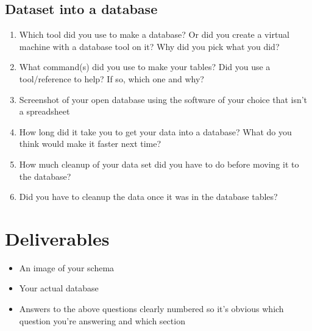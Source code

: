 \documentclass[12pt]{article}
\begin{document}
\subsection*{Dataset into a database}
    \begin{enumerate}
        \item Which tool did you use to make a database? Or did you create a virtual machine with a database tool on it? Why did you pick what you did?
        \item What command(s) did you use to make your tables? Did you use a tool/reference to help? If so, which one and why?
        \item Screenshot of your open database using the software of your choice that isn't a spreadsheet
        \item How long did it take you to get your data into a database? What do you think would make it faster next time?
        \item How much cleanup of your data set did you have to do before moving it to the database?
        \item Did you have to cleanup the data once it was in the database tables?
    \end{enumerate}



\section*{Deliverables}
\begin{itemize}
    \item An image of your schema
    \item Your actual database
    \item Answers to the above questions clearly numbered so it's obvious which question you're answering and which section
\end{itemize}
\end{document}
